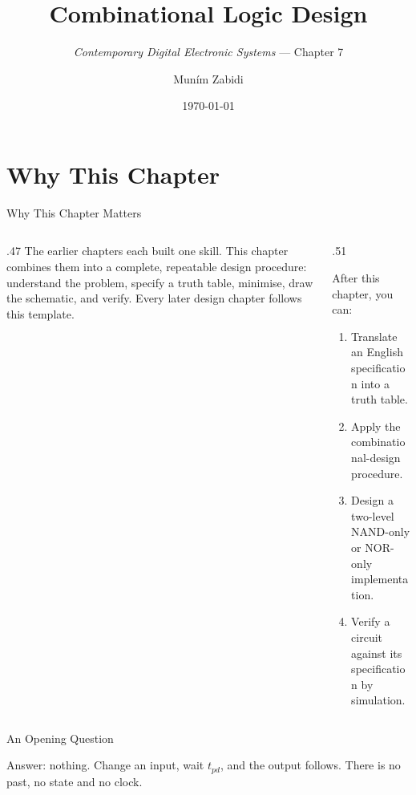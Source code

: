 \documentclass[9pt,aspectratio=169,xcolor=table]{beamer}
\title{Combinational Logic Design}
\subtitle{\emph{Contemporary Digital Electronic Systems} --- Chapter 7}
\author{Mun\'{i}m Zabidi}
\institute{\color{primary}Faculty of Electrical Engineering, Universiti Teknologi Malaysia}
\date{\today}
\begin{document}
\titlepage

\section{Why This Chapter}

\begin{frame}{Why This Chapter Matters}
  \begin{columns}[c]
  \begin{column}{.47\textwidth}
    The earlier chapters each built one skill. This chapter combines them into a complete, repeatable \alert{design procedure}: understand the problem, specify a truth table, minimise, draw the schematic, and verify. Every later design chapter follows this template.
  \end{column}
  \begin{column}{.51\textwidth}
    \begin{block}{After this chapter, you can:}
    {\small
    \begin{enumerate}\itemsep2pt
      \item Translate an English specification into a truth table.
      \item Apply the combinational-design procedure.
      \item Design a two-level NAND-only or NOR-only implementation.
      \item Verify a circuit against its specification by simulation.
    \end{enumerate}}
    \end{block}
  \end{column}
  \end{columns}
\end{frame}

\begin{frame}{An Opening Question}
  \leavevmode\vspace{4mm}
  \begin{center}
  \end{center}
  \vspace{4mm}
  Answer: nothing. Change an input, wait $t_{pd}$, and the output follows. There is no past, no state and no clock.
\end{frame}
\end{document}
